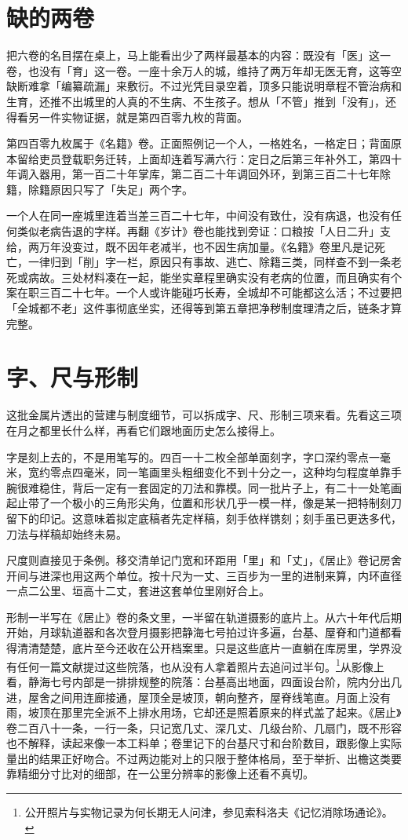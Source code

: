 \section{缺的两卷}

把六卷的名目摆在桌上，马上能看出少了两样最基本的内容：既没有「医」这一卷，也没有「育」这一卷。一座十余万人的城，维持了两万年却无医无育，这等空缺断难拿「编纂疏漏」来敷衍。不过光凭目录空着，顶多只能说明章程不管治病和生育，还推不出城里的人真的不生病、不生孩子。想从「不管」推到「没有」，还得看另一件实物证据，就是第四百零九枚的背面。

第四百零九枚属于《名籍》卷。正面照例记一个人，一格姓名，一格定日；背面原本留给吏员登载职务迁转，上面却连着写满六行：定日之后第三年补外工，第四十年调入器用，第一百二十年掌库，第二百二十年调回外环，到第三百二十七年除籍，除籍原因只写了「失足」两个字。

一个人在同一座城里连着当差三百二十七年，中间没有致仕，没有病退，也没有任何类似老病告退的字样。再翻《岁计》卷也能找到旁证：口粮按「人日二升」支给，两万年没变过，既不因年老减半，也不因生病加量。《名籍》卷里凡是记死亡，一律归到「削」字一栏，原因只有事故、逃亡、除籍三类，同样查不到一条老死或病故。三处材料凑在一起，能坐实章程里确实没有老病的位置，而且确实有个案在职三百二十七年。一个人或许能碰巧长寿，全城却不可能都这么活；不过要把「全城都不老」这件事彻底坐实，还得等到第五章把净秽制度理清之后，链条才算完整。

\section{字、尺与形制}

这批金属片透出的营建与制度细节，可以拆成字、尺、形制三项来看。先看这三项在月之都里长什么样，再看它们跟地面历史怎么接得上。

字是刻上去的，不是用笔写的。四百一十二枚全部单面刻字，字口深约零点一毫米，宽约零点四毫米，同一笔画里头粗细变化不到十分之一，这种均匀程度单靠手腕很难稳住，背后一定有一套固定的刀法和靠模。同一批片子上，有二十一处笔画起止带了一个极小的三角形尖角，位置和形状几乎一模一样，像是某一把特制刻刀留下的印记。这意味着拟定底稿者先定样稿，刻手依样镌刻；刻手虽已更迭多代，刀法与样稿却始终未易。

尺度则直接见于条例。移交清单记门宽和环距用「里」和「丈」，《居止》卷记房舍开间与进深也用这两个单位。按十尺为一丈、三百步为一里的进制来算，内环直径一点二公里、垣高十二丈，套进这套单位里刚好合上。

形制一半写在《居止》卷的条文里，一半留在轨道摄影的底片上。从六十年代后期开始，月球轨道器和各次登月摄影把静海七号拍过许多遍，台基、屋脊和门道都看得清清楚楚，底片至今还收在公开档案里。只是这些底片一直躺在库房里，学界没有任何一篇文献提过这些院落，也从没有人拿着照片去追问过半句。\footnote{公开照片与实物记录为何长期无人问津，参见索科洛夫《记忆消除场通论》。}从影像上看，静海七号内部是一排排规整的院落：台基高出地面，四面设台阶，院内分出几进，屋舍之间用连廊接通，屋顶全是坡顶，朝向整齐，屋脊线笔直。月面上没有雨，坡顶在那里完全派不上排水用场，它却还是照着原来的样式盖了起来。《居止》卷二百八十一条，一行一条，只记宽几丈、深几丈、几级台阶、几扇门，既不形容也不解释，读起来像一本工料单；卷里记下的台基尺寸和台阶数目，跟影像上实际量出的结果正好吻合。不过两边能对上的只限于整体格局，至于举折、出檐这类要靠精细分寸比对的细部，在一公里分辨率的影像上还看不真切。

